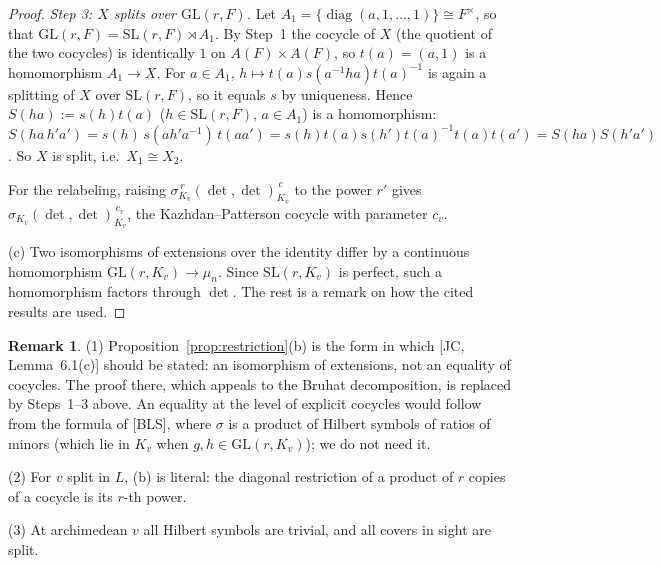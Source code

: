 \documentclass[12pt]{article}
\newcommand{\diag}{\operatorname{diag}}
\newcommand{\GL}{\mathrm{GL}}
\newcommand{\SL}{\mathrm{SL}}
\theoremstyle{plain}
\theoremstyle{definition}
\newtheorem{remark}[theorem]{Remark}
\begin{document}
\begin{proof}
\emph{Step 3: $X$ splits over $\GL(r,F)$.} Let $A_1=\{\diag(a,1,\dots,1)\}\cong F^\times$, so that $\GL(r,F)=\SL(r,F)\rtimes A_1$. By Step~1 the cocycle of $X$ (the quotient of the two cocycles) is identically $1$ on $A(F)\times A(F)$, so $t(a)=(a,1)$ is a homomorphism $A_1\to X$. For $a\in A_1$, $h\mapsto t(a)s(a^{-1}ha)t(a)^{-1}$ is again a splitting of $X$ over $\SL(r,F)$, so it equals $s$ by uniqueness. Hence $S(ha):=s(h)t(a)$ ($h\in\SL(r,F)$, $a\in A_1$) is a homomorphism: $S(ha\,h'a')=s(h)\,s(ah'a^{-1})\,t(aa')=s(h)t(a)s(h')t(a)^{-1}t(a)t(a')=S(ha)S(h'a')$. So $X$ is split, i.e.\ $X_1\cong X_2$.

For the relabeling, raising $\sigma_{K_v}^{\,r}(\det,\det)_{K_v}^{\,c}$ to the power $r'$ gives $\sigma_{K_v}(\det,\det)_{K_v}^{\,c_v}$, the Kazhdan--Patterson cocycle with parameter $c_v$.

(c) Two isomorphisms of extensions over the identity differ by a continuous homomorphism $\GL(r,K_v)\to\mu_n$. Since $\SL(r,K_v)$ is perfect, such a homomorphism factors through $\det$. The rest is a remark on how the cited results are used.
\end{proof}

\begin{remark}\label{rem:JC61c}
(1) Proposition~\ref{prop:restriction}(b) is the form in which [JC, Lemma~6.1(c)] should be stated: an isomorphism of extensions, not an equality of cocycles. The proof there, which appeals to the Bruhat decomposition, is replaced by Steps~1--3 above. An equality at the level of explicit cocycles would follow from the formula of [BLS], where $\sigma$ is a product of Hilbert symbols of ratios of minors (which lie in $K_v$ when $g,h\in\GL(r,K_v)$); we do not need it.

(2) For $v$ split in $L$, (b) is literal: the diagonal restriction of a product of $r$ copies of a cocycle is its $r$-th power.

(3) At archimedean $v$ all Hilbert symbols are trivial, and all covers in sight are split.
\end{remark}
\end{document}
